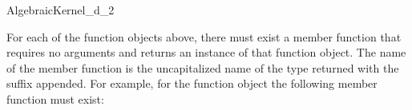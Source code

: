 \begin{ccRefConcept}{AlgebraicKernel_d_2}

\ccOperations

For each of the function objects above, there must exist a member function that requires no arguments and returns an instance of that function object. The name of the member function is the uncapitalized name of the type returned with the suffix  appended. For example, for the function object   the following member function must exist:


\ccSeeAlso

\\

\end{ccRefConcept}
